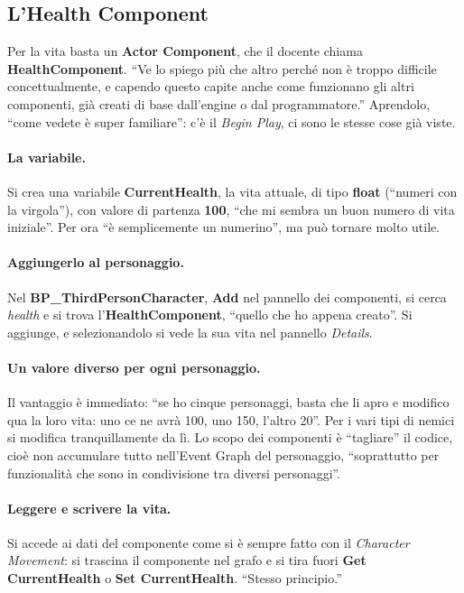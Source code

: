 \subsection{L'Health Component}

Per la vita basta un \textbf{Actor Component}, che il docente chiama
\textbf{HealthComponent}. ``Ve lo spiego più che altro perché non è troppo
difficile concettualmente, e capendo questo capite anche come funzionano gli
altri componenti, già creati di base dall'engine o dal programmatore.''
Aprendolo, ``come vedete è super familiare'': c'è il \emph{Begin Play}, ci sono
le stesse cose già viste.

\paragraph{La variabile.} Si crea una variabile \textbf{CurrentHealth}, la vita
attuale, di tipo \textbf{float} (``numeri con la virgola''), con valore di
partenza \textbf{100}, ``che mi sembra un buon numero di vita iniziale''. Per
ora ``è semplicemente un numerino'', ma può tornare molto utile.

\paragraph{Aggiungerlo al personaggio.} Nel \textbf{BP\_ThirdPersonCharacter},
\textbf{Add} nel pannello dei componenti, si cerca \emph{health} e si trova
l'\textbf{HealthComponent}, ``quello che ho appena creato''. Si aggiunge, e
selezionandolo si vede la sua vita nel pannello \emph{Details}.

\paragraph{Un valore diverso per ogni personaggio.} Il vantaggio è immediato:
``se ho cinque personaggi, basta che li apro e modifico qua la loro vita: uno ce
ne avrà 100, uno 150, l'altro 20''. Per i vari tipi di nemici si modifica
tranquillamente da lì. Lo scopo dei componenti è ``tagliare'' il codice, cioè
non accumulare tutto nell'Event Graph del personaggio, ``soprattutto per
funzionalità che sono in condivisione tra diversi personaggi''.

\paragraph{Leggere e scrivere la vita.} Si accede ai dati del componente come
si è sempre fatto con il \emph{Character Movement}: si trascina il componente
nel grafo e si tira fuori \textbf{Get CurrentHealth} o \textbf{Set
CurrentHealth}. ``Stesso principio.''


